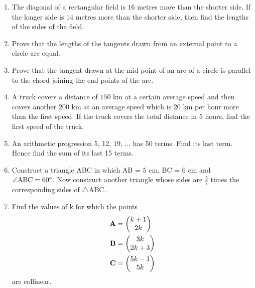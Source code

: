 \documentclass[journal,12pt,twocolumn]{IEEEtran}
\renewcommand\thesection{\arabic{section}}
\begin{document}
\begin{enumerate}[label=\thesection.\arabic*.,ref=\thesection.\theenumi]
\item The diagonal of a rectangular field is $16$ metres more than the shorter side. If the longer side is $14$ metres more than the shorter side, then find the lengths of the sides of the field.
\item Prove that the lengths of the tangents drawn from an external point to a circle are equal.
\item Prove that the tangent drawn at the mid-point of an arc of a circle is parallel to the chord joining the end points of the arc.
\item A truck covers a distance of $150$ km at a certain average speed and then covers another $200$ km at an average speed which is $20$ km per hour more than the first speed. If the truck covers the total distance in $5$ hours, find the first speed of the truck.
\item An arithmetic progression 5, 12, 19, ... has 50 terms. Find its last term. Hence find the sum of its last 15 terms.
\item Construct a triangle ABC in which AB = $5$ cm, BC = $6$ cm and $\angle \text{ABC} = 60\degree$. Now construct another triangle whose sides are $\frac{5}{7}$ times the corresponding sides of $\triangle \text{ABC}$.
\item Find the values of k for which the points
\begin{align}
\mathbf{A} &= \begin{pmatrix}k+1\\2k\end{pmatrix}\\
\mathbf{B} &= \begin{pmatrix}3k\\2k+3\end{pmatrix}\\
\mathbf{C} &= \begin{pmatrix}5k-1\\5k\end{pmatrix}
\end{align}
are collinear.
\end{enumerate}
\end{document}
